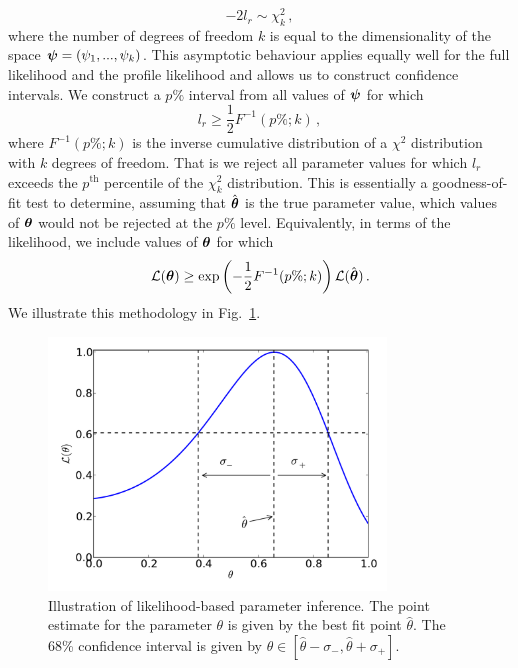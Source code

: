 \begin{equation}
-2l_r \sim \chi^2_k\,,
\end{equation}
where the number of degrees of freedom $k$ is equal to the dimensionality of the space $\boldsymbol\psi = \left(\psi_1,...,\psi_k\right)$.  This asymptotic behaviour applies equally well for the full likelihood and the profile likelihood and allows us to construct confidence intervals. We construct a $p\%$ interval from all values of $\boldsymbol\psi$ for which 
\begin{equation}
l_r \geq \frac{1}{2} F^{-1}(p\%;k)\,,
\end{equation}
where $F^{-1}(p\%;k)$ is the inverse cumulative distribution of a $\chi^2$ distribution with $k$ degrees of freedom. That is we reject all parameter values for which $l_r$ exceeds the $p^\textrm{th}$ percentile of the $\chi^2_k$ distribution. This is essentially a goodness-of-fit test to determine, assuming that $\hat{\boldsymbol\theta}$ is the true parameter value, which values of $\boldsymbol\theta$ would not be rejected at the $p\%$ level.  Equivalently, in terms of the likelihood, we include values of $\boldsymbol\theta$ for which
\begin{equation}
\mathcal{L}(\boldsymbol\theta) \geq \exp\left(-\frac{1}{2} F^{-1}(p\%;k)\right) \mathcal{L}(\hat{\boldsymbol\theta})\,.
\end{equation}
We illustrate this methodology in Fig.~\ref{fig:parameter:likelihood}. 

\begin{figure}[t]
\centering
  \includegraphics[width=0.8\textwidth]{ParamRecon/Likelihood.pdf}
  \caption[Likelihood-based parameter inference]{Illustration of likelihood-based parameter inference. The point estimate for the parameter $\theta$ is given by the best fit point $\hat{\theta}$. The 68\% confidence interval is given by $\theta \in [\hat{\theta} - \sigma_-, \hat{\theta} + \sigma_+]$.}
  \label{fig:parameter:likelihood}
\end{figure}

